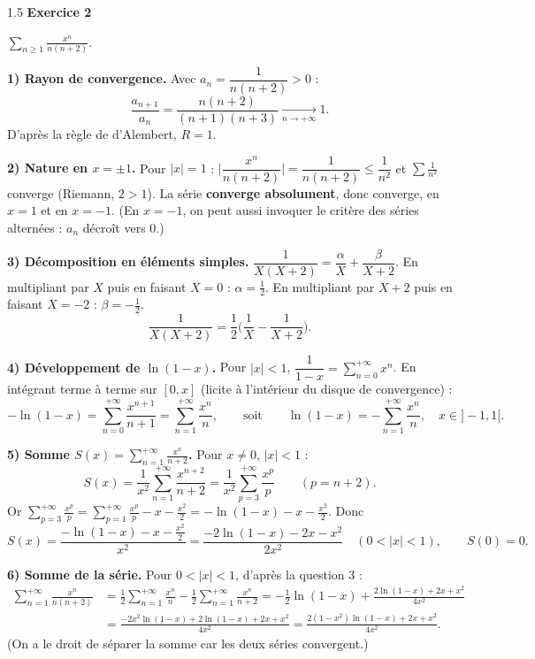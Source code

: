 \documentclass[12pt]{article}
\begin{document}
\begin{spacing}{1.5}
\medskip\textbf{Exercice 2}

$\displaystyle\sum_{n\ge1}\frac{x^n}{n(n+2)}$.

\textbf{1) Rayon de convergence.} Avec $a_n=\dfrac1{n(n+2)}>0$ :
\[
\frac{a_{n+1}}{a_n}=\frac{n(n+2)}{(n+1)(n+3)}\xrightarrow[n\to+\infty]{}1 .
\]
D'après la règle de d'Alembert, $\boxed{R=1}$.

\textbf{2) Nature en $x=\pm1$.} Pour $|x|=1$ : $\Big|\dfrac{x^n}{n(n+2)}\Big|=\dfrac1{n(n+2)}\le\dfrac1{n^2}$ et $\sum\frac1{n^2}$ converge (Riemann, $2>1$). La série \textbf{converge absolument}, donc converge, en $x=1$ et en $x=-1$. (En $x=-1$, on peut aussi invoquer le critère des séries alternées : $a_n$ décroît vers $0$.)

\textbf{3) Décomposition en éléments simples.} $\dfrac1{X(X+2)}=\dfrac{\alpha}{X}+\dfrac{\beta}{X+2}$. En multipliant par $X$ puis en faisant $X=0$ : $\alpha=\frac12$. En multipliant par $X+2$ puis en faisant $X=-2$ : $\beta=-\frac12$.
\[
\frac1{X(X+2)}=\frac12\Big(\frac1X-\frac1{X+2}\Big).
\]

\textbf{4) Développement de $\ln(1-x)$.} Pour $|x|<1$, $\dfrac1{1-x}=\displaystyle\sum_{n=0}^{+\infty}x^n$. En intégrant terme à terme sur $[0,x]$ (licite à l'intérieur du disque de convergence) :
\[
-\ln(1-x)=\sum_{n=0}^{+\infty}\frac{x^{n+1}}{n+1}=\sum_{n=1}^{+\infty}\frac{x^n}{n},\qquad\text{soit}\qquad \boxed{\ln(1-x)=-\sum_{n=1}^{+\infty}\frac{x^n}{n},\quad x\in]-1,1[}.
\]

\textbf{5) Somme $S(x)=\displaystyle\sum_{n=1}^{+\infty}\frac{x^n}{n+2}$.} Pour $x\neq0$, $|x|<1$ :
\[
S(x)=\frac1{x^2}\sum_{n=1}^{+\infty}\frac{x^{n+2}}{n+2}=\frac1{x^2}\sum_{p=3}^{+\infty}\frac{x^p}{p}\qquad(p=n+2).
\]
Or $\displaystyle\sum_{p=3}^{+\infty}\frac{x^p}{p}=\sum_{p=1}^{+\infty}\frac{x^p}{p}-x-\frac{x^2}{2}=-\ln(1-x)-x-\frac{x^2}2$. Donc
\[
\boxed{S(x)=\frac{-\ln(1-x)-x-\frac{x^2}{2}}{x^2}=\frac{-2\ln(1-x)-2x-x^2}{2x^2}}\quad(0<|x|<1),\qquad S(0)=0 .
\]

\textbf{6) Somme de la série.} Pour $0<|x|<1$, d'après la question 3 :
\begin{align*}
\sum_{n=1}^{+\infty}\frac{x^n}{n(n+2)}&=\frac12\sum_{n=1}^{+\infty}\frac{x^n}{n}-\frac12\sum_{n=1}^{+\infty}\frac{x^n}{n+2}
=-\frac12\ln(1-x)+\frac{2\ln(1-x)+2x+x^2}{4x^2}\\
&=\frac{-2x^2\ln(1-x)+2\ln(1-x)+2x+x^2}{4x^2}=\frac{2(1-x^2)\ln(1-x)+2x+x^2}{4x^2}.
\end{align*}
(On a le droit de séparer la somme car les deux séries convergent.)


\end{spacing}
\end{document}
